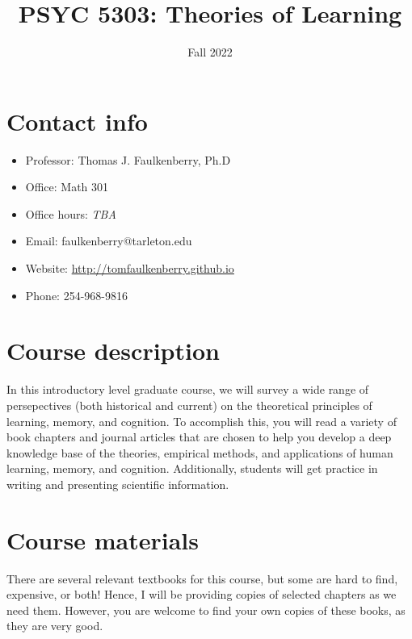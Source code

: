 \documentclass[10pt]{article}
\date{Fall 2022}
\title{PSYC 5303: Theories of Learning}
\begin{document}
\maketitle

\section*{Contact info}
\label{sec:org09a7eff}
\begin{itemize}
\item Professor: Thomas J. Faulkenberry, Ph.D
\item Office: Math 301
\item Office hours: \emph{TBA}
\item Email: faulkenberry@tarleton.edu
\item Website: \url{http://tomfaulkenberry.github.io}
\item Phone: 254-968-9816
\end{itemize}

\section*{Course description}
\label{sec:org4b1f27b}

In this introductory level graduate course, we will survey a wide range of persepectives (both historical and current) on the theoretical principles of learning, memory, and cognition.  To accomplish this, you will read a variety of book chapters and journal articles that are chosen to help you develop a deep knowledge base of the theories, empirical methods, and applications of human learning, memory, and cognition. Additionally, students will get practice in writing and presenting scientific information.

\section*{Course materials}
\label{sec:org7b49dda}

There are several relevant textbooks for this course, but some are hard to find, expensive, or both!  Hence, I will be providing copies of selected chapters as we need them.  However, you are welcome to find your own copies of these books, as they are very good.
\end{document}
